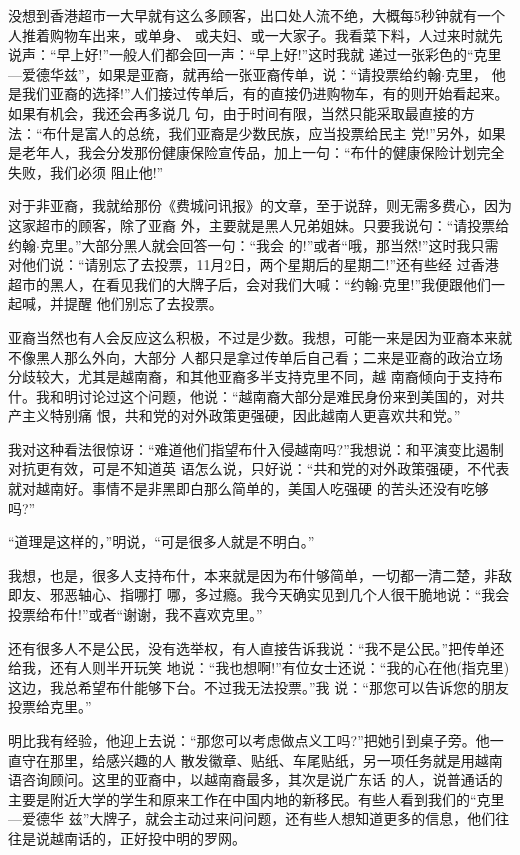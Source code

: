 ﻿\documentclass[11pt]{article}
\begin{document}
没想到香港超市一大早就有这么多顾客，出口处人流不绝，大概每5秒钟就有一个人推着购物车出来，或单身、
或夫妇、或一大家子。我看菜下料，人过来时就先说声：``早上好!''一般人们都会回一声：``早上好!''这时我就
递过一张彩色的``克里---爱德华兹''，如果是亚裔，就再给一张亚裔传单，说：``请投票给约翰$\cdot$克里，
他是我们亚裔的选择!''人们接过传单后，有的直接仍进购物车，有的则开始看起来。如果有机会，我还会再多说几
句，由于时间有限，当然只能采取最直接的方法：``布什是富人的总统，我们亚裔是少数民族，应当投票给民主
党!''另外，如果是老年人，我会分发那份健康保险宣传品，加上一句：``布什的健康保险计划完全失败，我们必须
阻止他!''

对于非亚裔，我就给那份《费城问讯报》的文章，至于说辞，则无需多费心，因为这家超市的顾客，除了亚裔
外，主要就是黑人兄弟姐妹。只要我说句：``请投票给约翰$\cdot$克里。''大部分黑人就会回答一句：``我会
的!''或者``哦，那当然!''这时我只需对他们说：``请别忘了去投票，11月2日，两个星期后的星期二!''还有些经
过香港超市的黑人，在看见我们的大牌子后，会对我们大喊：``约翰$\cdot$克里!''我便跟他们一起喊，并提醒
他们别忘了去投票。

亚裔当然也有人会反应这么积极，不过是少数。我想，可能一来是因为亚裔本来就不像黑人那么外向，大部分
人都只是拿过传单后自己看；二来是亚裔的政治立场分歧较大，尤其是越南裔，和其他亚裔多半支持克里不同，越
南裔倾向于支持布什。我和明讨论过这个问题，他说：``越南裔大部分是难民身份来到美国的，对共产主义特别痛
恨，共和党的对外政策更强硬，因此越南人更喜欢共和党。''

我对这种看法很惊讶：``难道他们指望布什入侵越南吗?''我想说：和平演变比遏制对抗更有效，可是不知道英
语怎么说，只好说：``共和党的对外政策强硬，不代表就对越南好。事情不是非黑即白那么简单的，美国人吃强硬
的苦头还没有吃够吗?''

``道理是这样的，''明说，``可是很多人就是不明白。''

我想，也是，很多人支持布什，本来就是因为布什够简单，一切都一清二楚，非敌即友、邪恶轴心、指哪打
哪，多过瘾。我今天确实见到几个人很干脆地说：``我会投票给布什!''或者``谢谢，我不喜欢克里。''

还有很多人不是公民，没有选举权，有人直接告诉我说：``我不是公民。''把传单还给我，还有人则半开玩笑
地说：``我也想啊!''有位女士还说：``我的心在他(指克里)这边，我总希望布什能够下台。不过我无法投票。''我
说：``那您可以告诉您的朋友投票给克里。''

明比我有经验，他迎上去说：``那您可以考虑做点义工吗?''把她引到桌子旁。他一直守在那里，给感兴趣的人
散发徽章、贴纸、车尾贴纸，另一项任务就是用越南语咨询顾问。这里的亚裔中，以越南裔最多，其次是说广东话
的人，说普通话的主要是附近大学的学生和原来工作在中国内地的新移民。有些人看到我们的``克里---爱德华
兹''大牌子，就会主动过来问问题，还有些人想知道更多的信息，他们往往是说越南话的，正好投中明的罗网。
\end{document}
